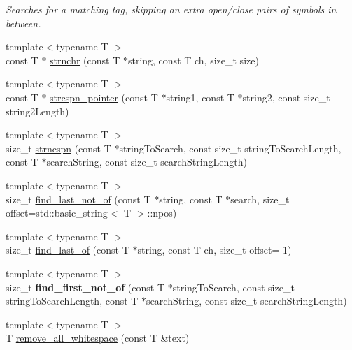 \begin{DoxyCompactItemize}
\begin{DoxyCompactList}\small\item\em Searches for a matching tag, skipping an extra open/close pairs of symbols in between. \end{DoxyCompactList}\item 
{\footnotesize template$<$typename T $>$ }\\const T $\ast$ \hyperlink{namespacestring__util_ac80a08ee0c58d8e159cb7524e23f0959}{strnchr} (const T $\ast$string, const T ch, size\-\_\-t size)
\item 
{\footnotesize template$<$typename T $>$ }\\const T $\ast$ \hyperlink{namespacestring__util_aa04954fbf48eee3f46463fd14e4a7d1a}{strcspn\-\_\-pointer} (const T $\ast$string1, const T $\ast$string2, const size\-\_\-t string2\-Length)
\item 
{\footnotesize template$<$typename T $>$ }\\size\-\_\-t \hyperlink{namespacestring__util_a1f36e95c675fb109d6d042bff7cc0487}{strncspn} (const T $\ast$string\-To\-Search, const size\-\_\-t string\-To\-Search\-Length, const T $\ast$search\-String, const size\-\_\-t search\-String\-Length)
\item 
{\footnotesize template$<$typename T $>$ }\\size\-\_\-t \hyperlink{namespacestring__util_a2d5dbb55649fe7c47191857735b7319e}{find\-\_\-last\-\_\-not\-\_\-of} (const T $\ast$string, const T $\ast$search, size\-\_\-t offset=std\-::basic\-\_\-string$<$ T $>$\-::npos)
\item 
{\footnotesize template$<$typename T $>$ }\\size\-\_\-t \hyperlink{namespacestring__util_aef82fb380f5c370be7f1aad3ba2d86cb}{find\-\_\-last\-\_\-of} (const T $\ast$string, const T ch, size\-\_\-t offset=-\/1)
\item 
\hypertarget{namespacestring__util_a3d2321452d97ffab53b920bf86398148}{{\footnotesize template$<$typename T $>$ }\\size\-\_\-t {\bfseries find\-\_\-first\-\_\-not\-\_\-of} (const T $\ast$string\-To\-Search, const size\-\_\-t string\-To\-Search\-Length, const T $\ast$search\-String, const size\-\_\-t search\-String\-Length)}\label{namespacestring__util_a3d2321452d97ffab53b920bf86398148}

\item 
\hypertarget{namespacestring__util_ac601c12172781e135da65305c87bfd50}{{\footnotesize template$<$typename T $>$ }\\T \hyperlink{namespacestring__util_ac601c12172781e135da65305c87bfd50}{remove\-\_\-all\-\_\-whitespace} (const T \&text)}\label{namespacestring__util_ac601c12172781e135da65305c87bfd50}


\end{DoxyCompactItemize}
